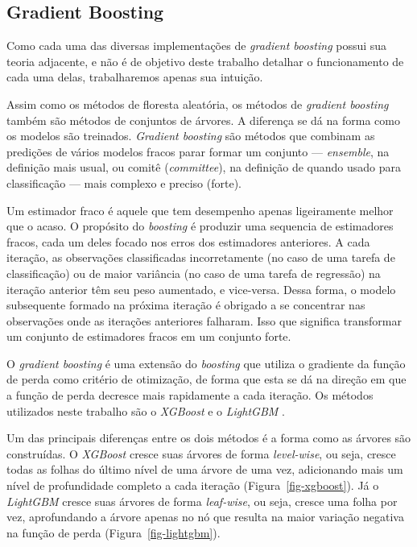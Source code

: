 \begin{apendicesenv}
\subsection{Gradient Boosting}\label{gradient-boosting}

Como cada uma das diversas implementações de \emph{gradient boosting}
possui sua teoria adjacente, e não é de objetivo deste trabalho detalhar
o funcionamento de cada uma delas, trabalharemos apenas sua intuição.

Assim como os métodos de floresta aleatória, os métodos de
\emph{gradient boosting} também são métodos de conjuntos de árvores. A
diferença se dá na forma como os modelos são treinados. \emph{Gradient
boosting} são métodos que combinam as predições de vários modelos fracos
parar formar um conjunto --- \emph{ensemble}, na definição mais usual,
ou comitê (\emph{committee}), na definição de
\textcite{hastie_elements_2009} quando usado para classificação --- mais
complexo e preciso (forte).

Um estimador fraco é aquele que tem desempenho apenas ligeiramente
melhor que o acaso. O propósito do \emph{boosting} é produzir uma
sequencia de estimadores fracos, cada um deles focado nos erros dos
estimadores anteriores. A cada iteração, as observações classificadas
incorretamente (no caso de uma tarefa de classificação) ou de maior
variância (no caso de uma tarefa de regressão) na iteração anterior têm
seu peso aumentado, e vice-versa. Dessa forma, o modelo subsequente
formado na próxima iteração é obrigado a se concentrar nas observações
onde as iterações anteriores falharam. Isso que significa transformar um
conjunto de estimadores fracos em um conjunto forte.

O \emph{gradient boosting} é uma extensão do \emph{boosting} que utiliza
o gradiente da função de perda como critério de otimização, de forma que
esta se dá na direção em que a função de perda decresce mais rapidamente
a cada iteração. Os métodos utilizados neste trabalho são o
\emph{XGBoost} \autocite{chen_xgboost_2016} e o \emph{LightGBM}
\autocite{ke_lightgbm_2017}.

Um das principais diferenças entre os dois métodos é a forma como as
árvores são construídas. O \emph{XGBoost} cresce suas árvores de forma
\emph{level-wise}, ou seja, cresce todas as folhas do último nível de
uma árvore de uma vez, adicionando mais um nível de profundidade
completo a cada iteração (Figura~\ref{fig-xgboost}). Já o
\emph{LightGBM} cresce suas árvores de forma \emph{leaf-wise}, ou seja,
cresce uma folha por vez, aprofundando a árvore apenas no nó que resulta
na maior variação negativa na função de perda
(Figura~\ref{fig-lightgbm}).


\end{apendicesenv}
